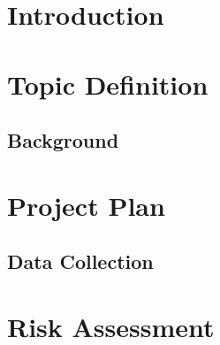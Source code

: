 \documentclass[a4paper]{article}
\begin{document}
\section{Introduction}

\section{Topic Definition}
\subsection{Background}

\section{Project Plan}
\subsection{Data Collection}

\section{Risk Assessment}
\end{document}
